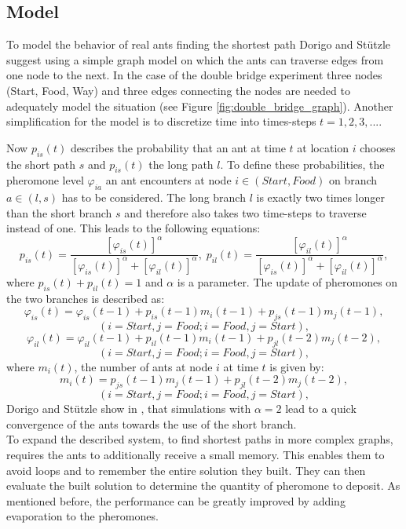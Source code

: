 \subsection{Model}
To model the behavior of real ants finding the shortest path Dorigo and Stützle \cite{DBLP:books/daglib/0013523} suggest using a simple graph model on which the ants can traverse edges from one node to the next. In the case of the double bridge experiment three nodes (Start, Food, Way) and three edges connecting the nodes are needed to adequately model the situation (see Figure \ref{fig:double_bridge_graph}). Another simplification for the model is to discretize time into times-steps $t = 1,2,3,...$.

Now $p_{is}(t)$ describes the probability that an ant at time $t$ at location $i$ chooses the short path $s$ and $p_{is}(t)$ the long path $l$. To define these probabilities, the pheromone level $\varphi_{ia}$ an ant encounters at node $i\in{(Start,Food)}$ on branch $a \in {(l, s)}$ has to be considered. The long branch $l$ is exactly two times longer than the short branch $s$ and therefore also takes two time-steps to traverse instead of one. This leads to the following equations:
$$p_{is}(t) = \frac{[\varphi_{is}(t)]^\alpha}{[\varphi_{is}(t)]^\alpha + [\varphi_{il}(t)]^\alpha}, \;p_{il}(t) = \frac{[\varphi_{il}(t)]^\alpha}{[\varphi_{is}(t)]^\alpha + [\varphi_{il}(t)]^\alpha},$$
where $p_{is}(t) + p_{il}(t) = 1$ and $\alpha$ is a parameter. The update of pheromones on the two branches is described as:
$$\varphi_{is}(t) = \varphi_{is}(t-1) + p_{is}(t-1)m_i(t-1) + p_{js}(t-1)m_j(t-1),$$
$$(i = Start, j = Food; i = Food, j = Start),$$
$$\varphi_{il}(t) = \varphi_{il}(t-1) + p_{il}(t-1)m_i(t-1) + p_{jl}(t-2)m_j(t-2),$$
$$(i = Start, j = Food; i = Food, j = Start),$$
where $m_i(t)$, the number of ants at node $i$ at time $t$ is given by:
$$m_i(t) =  p_{js}(t-1)m_j(t-1) + p_{jl}(t-2)m_j(t-2),$$
$$(i = Start, j = Food; i = Food, j = Start),$$
Dorigo and Stützle show in \cite{DBLP:books/daglib/0013523}, that simulations with $\alpha = 2$ lead to a quick convergence of the ants towards the use of the short branch.\\
To expand the described system, to find shortest paths in more complex graphs, requires the ants to additionally receive a small memory. This enables them to avoid loops and to remember the entire solution they built. They can then evaluate the built solution to determine the quantity of pheromone to deposit. As mentioned before, the performance can be greatly improved by adding evaporation to the pheromones.

